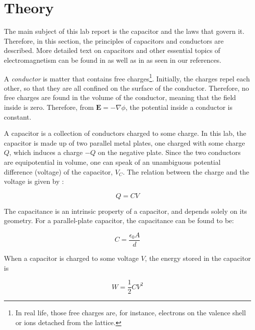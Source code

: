 \section{Theory} \label{sec:theory}

The main subject of this lab report is the capacitor and the laws that govern it. Therefore, in this section, the principles of capacitors and conductors are described. More detailed text on capacitors and other essential topics of electromagnetism can be found in \cite{griffiths} as well as in \cite{manual} as seen in our references.

A \textit{conductor} is matter that contains free charges\footnote{In real life, those free charges are, for instance, electrons on the valence shell or ions detached from the lattice.}. Initially, the charges repel each other, so that they are all confined on the surface of the conductor. Therefore, no free charges are found in the volume of the conductor, meaning that the field inside is zero. Therefore, from $\mathbf{E} = -\nabla \phi$, the potential inside a conductor is constant. 

A capacitor is a collection of conductors charged to some charge. In this lab, the capacitor is made up of two parallel metal plates, one charged with some charge $Q$, which induces a charge $-Q$ on the negative plate. Since the two conductors are equipotential in volume, one can speak of an unambiguous potential difference (voltage) of the capacitor, $V_C$. The relation between the charge and the voltage is given by \cite{griffiths}:

\begin{equation*}
    Q = CV
\end{equation*}

The capacitance is an intrinsic property of a capacitor, and depends solely on its geometry. For a parallel-plate capacitor, the capacitance can be found to be: \cite{griffiths}

\begin{equation*}
    C = \frac{\epsilon_0 A}{d}
\end{equation*}

When a capacitor is charged to some voltage $V$, the energy stored in the capacitor is \cite{manual}

\begin{equation*}
    W = \frac{1}{2}CV^2
\end{equation*}
